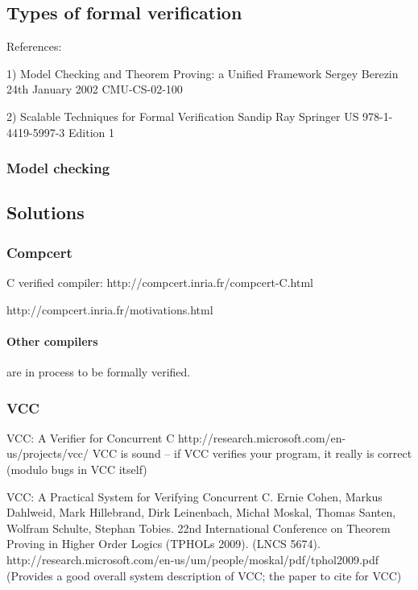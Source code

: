 \subsection{Types of formal verification}

References:

1) Model Checking and Theorem Proving:
a Unified Framework
Sergey Berezin
24th January 2002
CMU-CS-02-100


2) Scalable Techniques for Formal Verification
Sandip Ray
Springer US
978-1-4419-5997-3
Edition 1


\subsubsection{Model checking}

\subsection{Solutions}

\subsubsection{Compcert}

C verified compiler:  http://compcert.inria.fr/compcert-C.html

http://compcert.inria.fr/motivations.html


\paragraph{Other compilers} are in process to be formally verified.

\subsubsection{VCC}

VCC: A Verifier for Concurrent C  http://research.microsoft.com/en-us/projects/vcc/
VCC is sound -- if VCC verifies your program, it really is correct (modulo bugs in VCC itself)

VCC: A Practical System for Verifying Concurrent C. Ernie Cohen, Markus Dahlweid, Mark Hillebrand, Dirk Leinenbach, Michał Moskal, Thomas Santen, Wolfram Schulte, Stephan Tobies. 22nd International Conference on Theorem Proving in Higher Order Logics (TPHOLs 2009). (LNCS 5674). http://research.microsoft.com/en-us/um/people/moskal/pdf/tphol2009.pdf (Provides a good overall system description of VCC; the paper to cite for VCC)


